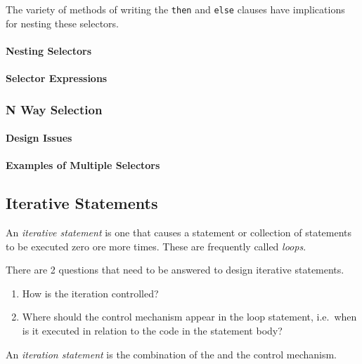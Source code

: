 The variety of methods of writing the \texttt{then} and \texttt{else} clauses have implications for nesting these selectors.

\paragraph{Nesting Selectors}\label{par:2_Way_Selection-Nesting}
\paragraph{Selector Expressions}\label{par:2_Way_Selection-Selector_Expressions}

\subsubsection{N Way Selection}\label{subsubsec:N_Way_Selection}
\paragraph{Design Issues}\label{par:N_Way_Selection-Design_Issues}
\paragraph{Examples of Multiple Selectors}\label{par:N_Way_Selection-Examples}

\subsection{Iterative Statements}\label{subsec:Iterative_Statements}
\begin{definition}\label{def:Iterative_Statement}
  An \emph{iterative statement} is one that causes a statement or collection of statements to be executed zero ore more times.
  These are frequently called \emph{loops}.

  There are 2 questions that need to be answered to design iterative statements.
  \begin{enumerate}[noitemsep]
  \item How is the iteration controlled?
  \item Where should the control mechanism appear in the loop statement, i.e.\ when is it executed in relation to the code in the statement body?
  \end{enumerate}

  \begin{remark}\label{rmk:Iteration_Statement}
    An \emph{iteration statement} is the combination of the  and the control mechanism.
  \end{remark}
\end{definition}

